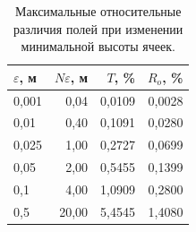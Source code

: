 \begin{table}[htbp]
\centering\small
\caption{Максимальные относительные различия полей при изменении минимальной высоты ячеек.}\label{tab:minimum}
\begin{tabular}{lrrr}
\toprule
$\varepsilon$, м & $N\varepsilon$, м & $T$, \% & $R_o$, \% \\
\midrule
0,001 & 0,04 & 0,0109 & 0,0028 \\
0,01 & 0,40 & 0,1091 & 0,0280 \\
0,025 & 1,00 & 0,2727 & 0,0699 \\
0,05 & 2,00 & 0,5455 & 0,1399 \\
0,1 & 4,00 & 1,0909 & 0,2800 \\
0,5 & 20,00 & 5,4545 & 1,4080 \\
\bottomrule
\end{tabular}
\end{table}
